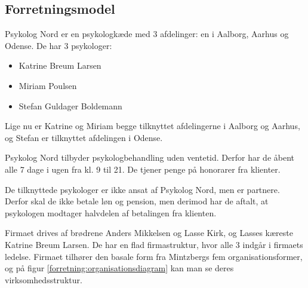 \subsection{Forretningsmodel}
Psykolog Nord er en psykologkæde med 3 afdelinger: en i Aalborg, Aarhus og Odense. De har 3 psykologer:

\begin{itemize}
    \item Katrine Breum Larsen
    \item Miriam Poulsen
    \item Stefan Guldager Boldemann
\end{itemize}

Lige nu er Katrine og Miriam begge tilknyttet afdelingerne i Aalborg og Aarhus, og Stefan er tilknyttet afdelingen i Odense.

Psykolog Nord tilbyder psykologbehandling uden ventetid.
Derfor har de åbent alle 7 dage i ugen fra kl. 9 til 21. De tjener penge på honorarer fra klienter.

De tilknyttede psykologer er ikke ansat af Psykolog Nord, men er partnere.
Derfor skal de ikke betale løn og pension, men derimod har de aftalt, at psykologen modtager halvdelen af betalingen fra klienten.

Firmaet drives af brødrene Anders Mikkelsen og Lasse Kirk, og Lasses kæreste Katrine Breum Larsen.
De har en flad firmastruktur, hvor alle 3 indgår i firmaets ledelse. 
Firmaet tilhører den basale form fra Mintzbergs fem organisationsformer, og på figur \ref{forretning:organisationsdiagram} kan man se deres virksomhedsstruktur.

